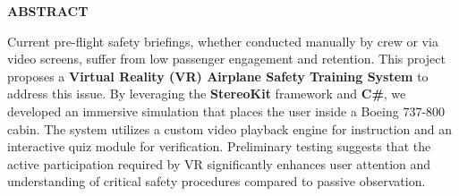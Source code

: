 \begin{center}
	\thispagestyle{plain}
	\Large \textbf{ABSTRACT}
\end{center}
\vspace{0.5cm}

Current pre-flight safety briefings, whether conducted manually by crew or via video screens, suffer from low passenger engagement and retention. This project proposes a \textbf{Virtual Reality (VR) Airplane Safety Training System} to address this issue. By leveraging the \textbf{StereoKit} framework and \textbf{C\#}, we developed an immersive simulation that places the user inside a Boeing 737-800 cabin. The system utilizes a custom video playback engine for instruction and an interactive quiz module for verification. Preliminary testing suggests that the active participation required by VR significantly enhances user attention and understanding of critical safety procedures compared to passive observation.
